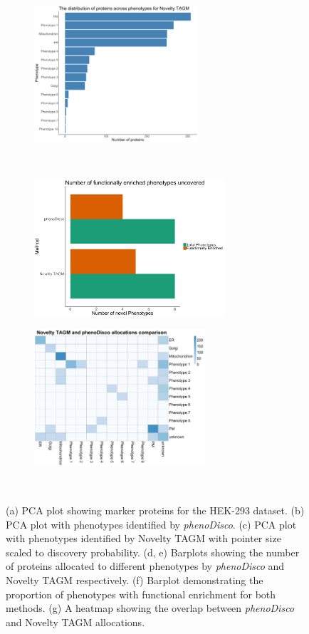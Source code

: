 \documentclass[12pt,english]{article}
\begin{document}
\begin{figure}
\begin{subfigure}[t]{0.5\textwidth}
		\caption{}
	\end{subfigure}
	\begin{subfigure}[t]{0.5\textwidth}
		\centering
		\includegraphics[height=2in]{noveltytagmdist}
		\caption{}
	\end{subfigure}	
~
\begin{subfigure}[t]{0.5\textwidth}
	\centering
	\includegraphics[height=2in]{phenonumhek}
	\caption{}
\end{subfigure}
	\begin{subfigure}[t]{0.5\textwidth}
	\centering
	\includegraphics[height=2in]{hekcompare}
	\caption{}
\end{subfigure}
~
	\caption{(a) PCA plot showing marker proteins for the HEK-293 dataset. (b) PCA plot with phenotypes identified by \textit{phenoDisco}. (c) PCA plot with phenotypes identified by Novelty TAGM with pointer size scaled to discovery probability. (d, e) Barplots showing the number of proteins allocated to different phenotypes by \textit{phenoDisco} and Novelty TAGM respectively. (f) Barplot demonstrating the proportion of phenotypes with functional enrichment for both methods. (g) A heatmap showing the overlap between \textit{phenoDisco} and Novelty TAGM allocations.
	}
	\label{figure:phenodisco}
\end{figure}
\clearpage
\end{document}
